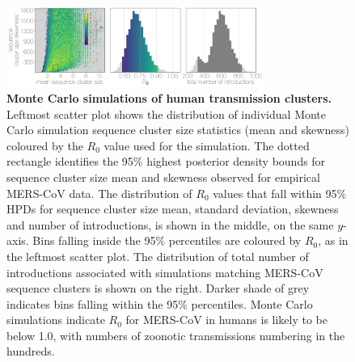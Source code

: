\documentclass[9pt,lineno]{elife}
\begin{document}
\begin{figure}[h]
\centering
	\includegraphics[width=0.75\textwidth]{figures/figure 3.png}
	\caption{\textbf{Monte Carlo simulations of human transmission clusters.}
  Leftmost scatter plot shows the distribution of individual Monte Carlo simulation sequence cluster size statistics (mean and skewness) coloured by the $R_{0}$ value used for the simulation.
  The dotted rectangle identifies the 95\% highest posterior density bounds for sequence cluster size mean and skewness observed for empirical MERS-CoV data.
  The distribution of $R_{0}$ values that fall within 95\% HPDs for sequence cluster size mean, standard deviation, skewness and number of introductions, is shown in the middle, on the same $y$-axis.
  Bins falling inside the 95\% percentiles are coloured by $R_{0}$, as in the leftmost scatter plot.
  The distribution of total number of introductions associated with simulations matching MERS-CoV sequence clusters is shown on the right.
  Darker shade of grey indicates bins falling within the 95\% percentiles.
  Monte Carlo simulations indicate $R_{0}$ for MERS-CoV in humans is likely to be below 1.0, with numbers of zoonotic transmissions numbering in the hundreds.
	}
	\label{mers_epi}


\end{figure}
\end{document}
